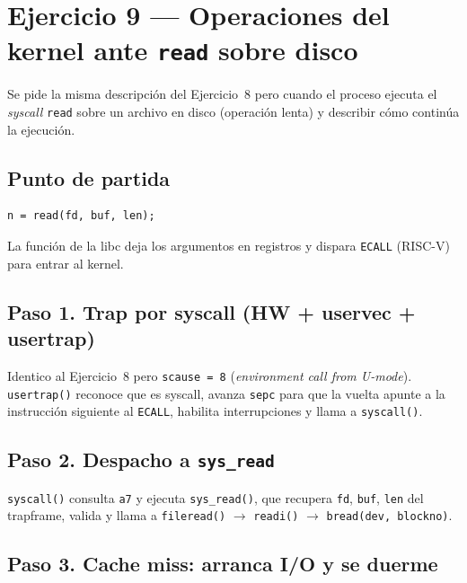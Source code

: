 \documentclass[11pt,a4paper]{article}
\begin{document}
\section{Ejercicio 9 --- Operaciones del kernel ante \texttt{read} sobre disco}

Se pide la misma descripción del Ejercicio~8 pero cuando el proceso
ejecuta el \emph{syscall} \texttt{read} sobre un archivo en disco
(operación lenta) y describir cómo continúa la ejecución.

\subsection*{Punto de partida}

\begin{lstlisting}[style=cstyle]
n = read(fd, buf, len);
\end{lstlisting}

La función de la libc deja los argumentos en registros y dispara
\texttt{ECALL} (RISC-V) para entrar al kernel.

\subsection*{Paso 1. Trap por syscall (HW + uservec + usertrap)}

Identico al Ejercicio~8 pero \texttt{scause = 8} (\emph{environment
call from U-mode}). \texttt{usertrap()} reconoce que es syscall, avanza
\texttt{sepc} para que la vuelta apunte a la instrucción siguiente al
\texttt{ECALL}, habilita interrupciones y llama a \texttt{syscall()}.

\subsection*{Paso 2. Despacho a \texttt{sys\_read}}

\texttt{syscall()} consulta \texttt{a7} y ejecuta \texttt{sys\_read()},
que recupera \texttt{fd}, \texttt{buf}, \texttt{len} del trapframe,
valida y llama a \texttt{fileread()} $\rightarrow$ \texttt{readi()}
$\rightarrow$ \texttt{bread(dev, blockno)}.

\subsection*{Paso 3. Cache miss: arranca I/O y se duerme}
\end{document}
